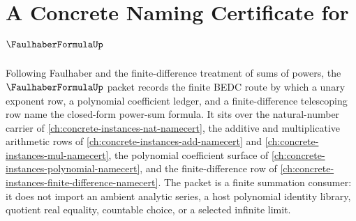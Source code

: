 \chapter{A Concrete Naming Certificate for $\FaulhaberFormulaUp$}
\label{ch:concrete-instances-faulhaber-formula-namecert}

Following Faulhaber and the finite-difference treatment of sums of powers, the $\FaulhaberFormulaUp$ packet records the finite BEDC route by which a unary exponent row, a polynomial coefficient ledger, and a finite-difference telescoping row name the closed-form power-sum formula. It sits over the natural-number carrier of \autoref{ch:concrete-instances-nat-namecert}, the additive and multiplicative arithmetic rows of \autoref{ch:concrete-instances-add-namecert} and \autoref{ch:concrete-instances-mul-namecert}, the polynomial coefficient surface of \autoref{ch:concrete-instances-polynomial-namecert}, and the finite-difference row of \autoref{ch:concrete-instances-finite-difference-namecert}. The packet is a finite summation consumer: it does not import an ambient analytic series, a host polynomial identity library, quotient real equality, countable choice, or a selected infinite limit.

